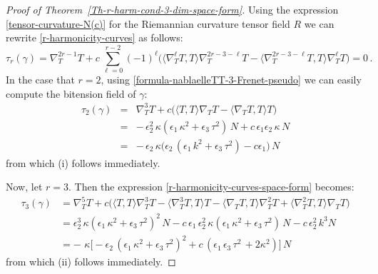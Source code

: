 \documentclass[11pt]{amsart}
\theoremstyle{plain}
\theoremstyle{definition}
\numberwithin{equation}{section}
\begin{document}
\begin{proof}[Proof of Theorem~\ref{Th-r-harm-cond-3-dim-space-form}]
Using the expression \eqref{tensor-curvature-N(c)} for the Riemannian curvature tensor field $R$ we can rewrite \eqref{r-harmonicity-curves} as follows:
\begin{equation}\label{r-harmonicity-curves-space-form}
\tau_r(\gamma)=\nabla^{2r-1}_T T+ c\,\sum_{\ell=0}^{r-2}(-1)^\ell \big(\langle \nabla^{\ell}_T T,T \rangle \nabla^{2r-3-\ell}_T T -\langle \nabla^{2r-3-\ell}_T T,T \rangle \nabla^{\ell}_T T\big) =0 \,.
\end{equation}
In the case that $r = 2$, using \eqref{formula-nablaelleTT-3-Frenet-pseudo} we can easily compute the bitension field of $\gamma$:
\begin{eqnarray*}
\tau_2(\gamma) & = &\nabla^3_T T + c \big( \langle T,T \rangle \nabla_T T - \langle \nabla_T T,T \rangle T \big) \\
&=&  - \,\epsilon_2^2\, \kappa (\epsilon_1 \, \kappa^2 + \epsilon_3 \, \tau^2) \,N + c \, \epsilon_1 \epsilon_2 \, \kappa \, N\\
& = & - \,\epsilon_2\, \kappa \big( \epsilon_2 \, (\epsilon_1 \, k^2 + \epsilon_3 \, \tau^2)- c \epsilon_1 \big) \, N 
\end{eqnarray*}
from which (i) follows immediately.

Now, let $r=3$. Then the expression \eqref{r-harmonicity-curves-space-form} becomes:
\[
\begin{aligned}
\tau_3(\gamma) & = \nabla^5_T T + c \big( \langle T,T \rangle \nabla_T^3 T - \langle \nabla^3_T T,T \rangle T - \langle \nabla_T T,T \rangle \nabla^2_T T + \langle \nabla^2_T T,T \rangle \nabla_T T \big) \\
& =   \epsilon_2^3\, \kappa (\epsilon_1 \, \kappa^2 + \epsilon_3 \, \tau^2)^2\,N - c \, \epsilon_1 \,\epsilon_2^2\, \kappa (\epsilon_1 \, \kappa^2 + \epsilon_3 \, \tau^2) \, N - c \, \epsilon_2^2 \, k^3 N\\
& =  - \, \, \kappa \Big[ - \epsilon_2 \, (\epsilon_1 \, \kappa^2 + \epsilon_3 \, \tau^2)^2 + c \, ( \epsilon_1\,\epsilon_3 \, \tau^2\, + 2 \kappa^2 ) \Big] \, N 
\end{aligned}
\]
from which (ii) follows immediately.


\end{proof}
\end{document}
